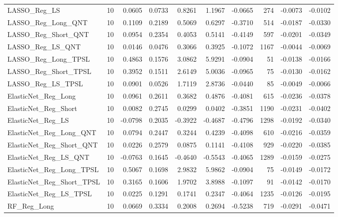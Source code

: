 \begin{tabular}{llrrrrrrrr}
\cline{1-10}
LASSO\_Reg\_LS & 10 & 0.0605 & 0.0733 & 0.8261 & 1.1967 & -0.0665 & 274 & -0.0073 & -0.0102 \\
\cline{1-10}
LASSO\_Reg\_Long\_QNT & 10 & 0.1109 & 0.2189 & 0.5069 & 0.6297 & -0.3710 & 514 & -0.0187 & -0.0330 \\
\cline{1-10}
LASSO\_Reg\_Short\_QNT & 10 & 0.0954 & 0.2354 & 0.4053 & 0.5141 & -0.4149 & 597 & -0.0201 & -0.0349 \\
\cline{1-10}
LASSO\_Reg\_LS\_QNT & 10 & 0.0146 & 0.0476 & 0.3066 & 0.3925 & -0.1072 & 1167 & -0.0044 & -0.0069 \\
\cline{1-10}
LASSO\_Reg\_Long\_TPSL & 10 & 0.4863 & 0.1576 & 3.0862 & 5.9291 & -0.0904 & 51 & -0.0138 & -0.0166 \\
\cline{1-10}
LASSO\_Reg\_Short\_TPSL & 10 & 0.3952 & 0.1511 & 2.6149 & 5.0036 & -0.0965 & 75 & -0.0130 & -0.0162 \\
\cline{1-10}
LASSO\_Reg\_LS\_TPSL & 10 & 0.0901 & 0.0526 & 1.7119 & 2.8736 & -0.0440 & 85 & -0.0049 & -0.0066 \\
\cline{1-10}
ElasticNet\_Reg\_Long & 10 & 0.0961 & 0.2611 & 0.3682 & 0.4876 & -0.4081 & 615 & -0.0236 & -0.0378 \\
\cline{1-10}
ElasticNet\_Reg\_Short & 10 & 0.0082 & 0.2745 & 0.0299 & 0.0402 & -0.3851 & 1190 & -0.0231 & -0.0402 \\
\cline{1-10}
ElasticNet\_Reg\_LS & 10 & -0.0798 & 0.2035 & -0.3922 & -0.4687 & -0.4796 & 1298 & -0.0192 & -0.0340 \\
\cline{1-10}
ElasticNet\_Reg\_Long\_QNT & 10 & 0.0794 & 0.2447 & 0.3244 & 0.4239 & -0.4098 & 610 & -0.0216 & -0.0359 \\
\cline{1-10}
ElasticNet\_Reg\_Short\_QNT & 10 & 0.0226 & 0.2579 & 0.0875 & 0.1141 & -0.4108 & 929 & -0.0220 & -0.0385 \\
\cline{1-10}
ElasticNet\_Reg\_LS\_QNT & 10 & -0.0763 & 0.1645 & -0.4640 & -0.5543 & -0.4065 & 1289 & -0.0159 & -0.0275 \\
\cline{1-10}
ElasticNet\_Reg\_Long\_TPSL & 10 & 0.5067 & 0.1698 & 2.9832 & 5.9862 & -0.0904 & 75 & -0.0149 & -0.0172 \\
\cline{1-10}
ElasticNet\_Reg\_Short\_TPSL & 10 & 0.3165 & 0.1606 & 1.9702 & 3.8988 & -0.1097 & 91 & -0.0142 & -0.0170 \\
\cline{1-10}
ElasticNet\_Reg\_LS\_TPSL & 10 & 0.0225 & 0.1291 & 0.1741 & 0.2347 & -0.4064 & 1235 & -0.0126 & -0.0195 \\
\cline{1-10}
RF\_Reg\_Long & 10 & 0.0669 & 0.3334 & 0.2008 & 0.2694 & -0.5238 & 719 & -0.0291 & -0.0471 \\

\end{tabular}
